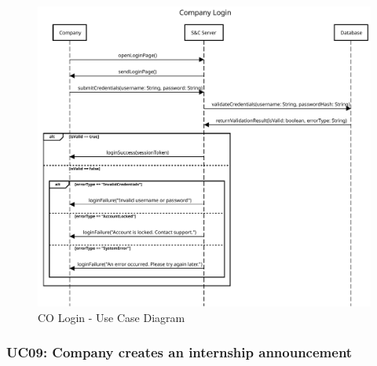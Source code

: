 \begin{figure}[H]
    \centering
    \includegraphics[width=1.0\textwidth]{Images/UC_8.pdf}
    \caption{CO Login - Use Case Diagram}
    \label{fig:use-case-diagram-8}
\end{figure}


\subsubsection{UC09: Company creates an internship announcement}
\label{subsubsec:company-creates-an-internship-announcement}

